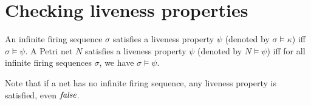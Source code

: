 \chapter{Checking liveness properties}
\label{chap:checking_liveness_properties}

\begin{definition}
\end{definition}

\begin{definition}
    An infinite firing sequence $σ$ satisfies a liveness
    property $ψ$ (denoted by $σ \models κ$) iff
    $σ \models ψ$.
    A Petri net $N$ satisfies a liveness property $ψ$
    (denoted by $N \models ψ$) iff
    for all infinite firing sequences $σ$, we have
    $σ \models ψ$.
\end{definition}

Note that if a net has no infinite firing sequence, any
liveness property is satisfied, even $\operatorname{\mathit{false}}$.



